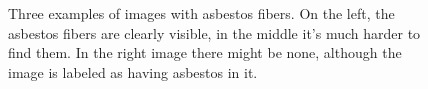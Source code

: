 \begin{figure}[h]
\centering
\caption{Three examples of images with asbestos fibers. On the left, the asbestos fibers are clearly visible, in the middle it's much harder to find them. In the right image there might be none, although the image is labeled as having asbestos in it.}
\label{fig:asbestos_examples}
\end{figure}

